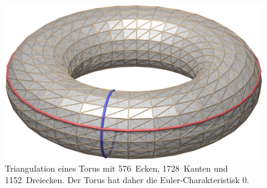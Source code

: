 %
%
%
\begin{figure}
\centering
\includegraphics[width=\textwidth]{chapters/120-topologie/images/torus.jpg}
\caption{Triangulation eines Torus mit 576~Ecken, 1728~Kanten und
1152~Dreiecken.
Der Torus hat daher die Euler-Charakteristisk $0$.
%
%
\label{buch:topologie:intro:fig:torus}}
\end{figure}

